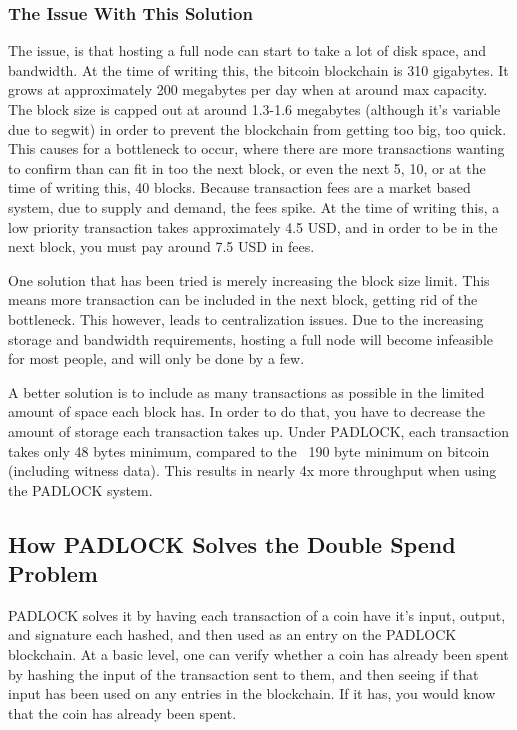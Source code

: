 \documentclass[12pt, letterpaper]{article} \usepackage[utf8]{inputenc}
\begin{document}
\subsubsection{The Issue With This Solution} The issue, is that hosting a full
node can start to take a lot of disk space, and bandwidth. At the time of
writing this, the bitcoin blockchain is 310 gigabytes. It grows at
approximately 200 megabytes per day when at around max capacity. The block size
is capped out at around 1.3-1.6 megabytes (although it's variable due to
segwit) in order to prevent the blockchain from getting too big, too quick.
This causes for a bottleneck to occur, where there are more transactions
wanting to confirm than can fit in too the next block, or even the next 5, 10,
or at the time of writing this, 40 blocks. Because transaction fees are a
market based system, due to supply and demand, the fees spike. At the time of
writing this, a low priority transaction takes approximately 4.5 USD, and in
order to be in the next block, you must pay around 7.5 USD in fees.

One solution that has been tried is merely increasing the block size limit.
This means more transaction can be included in the next block, getting rid of
the bottleneck. This however, leads to centralization issues. Due to the
increasing storage and bandwidth requirements, hosting a full node will become
infeasible for most people, and will only be done by a few.

A better solution is to include as many transactions as possible in the limited
amount of space each block has. In order to do that, you have to decrease the
amount of storage each transaction takes up. Under PADLOCK, each transaction
takes only 48 bytes minimum, compared to the ~190 byte minimum on bitcoin
(including witness data). This results in nearly 4x more throughput when using
the PADLOCK system.

\subsection{How PADLOCK Solves the Double Spend Problem} PADLOCK solves it by
having each transaction of a coin have it's input, output, and signature each
hashed, and then used as an entry on the PADLOCK blockchain. At a basic level,
one can verify whether a coin has already been spent by hashing the input of
the transaction sent to them, and then seeing if that input has been used on
any entries in the blockchain. If it has, you would know that the coin has
already been spent.
\end{document}
